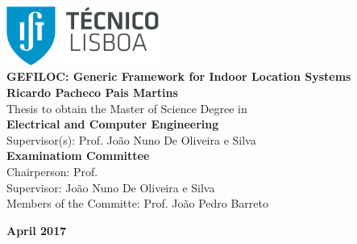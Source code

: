 \setcounter{page}{1} 


\thispagestyle{empty}
\begin{flushleft} ~\\ \vspace{-12mm} \hspace{-12mm}  \includegraphics[width=50mm]{Figures/Cover/istnewlogo.jpg} 
\vspace{10mm}
\\ \vspace{50mm} %
 \vspace{5mm}
\centering
\LARGE \textbf{GEFILOC: Generic Framework for Indoor Location Systems}
\\ \vspace{15mm}
\Large \textbf{Ricardo Pacheco Pais Martins} \\
\vspace{12mm}
\large Thesis to obtain the Master of Science Degree in
\\ \vspace{2mm}
\LARGE \textbf{Electrical and Computer Engineering}
\\ \vspace{10mm}
\large Supervisor(s): Prof. João Nuno De Oliveira e Silva
\\ \vspace{15mm}
\Large \textbf{Examinatiom Committee}
\\ \vspace{5mm}
\large Chairperson:	Prof.  \\
\large Supervisor: João Nuno De Oliveira e Silva\\
\large Members of the Committe: Prof. João Pedro Barreto
 
\vspace{15mm}

\Large \textbf{April 2017} \\
\let\thepage\relax
\end{flushleft}
\pagebreak


\clearpage

\thispagestyle{empty}
\cleardoublepage

\setcounter{page}{1} 

\baselineskip 18pt %
